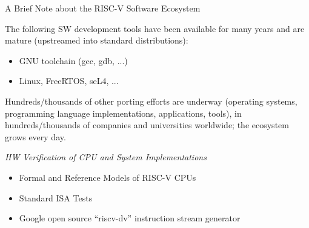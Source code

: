 \documentclass{article}
\begin{document}
\clearpage


\begin{center}
  {\Huge
    A Brief Note about the RISC-V Software Ecosystem}

  \vspace*{1in}

  \begin{minipage}{9in}\LARGE
    The following SW development tools have been available for many
    years and are mature (upstreamed into standard distributions):

    \begin{itemize}
    \item GNU toolchain (gcc, gdb, ...)
    \item Linux, FreeRTOS, seL4, ...
    \end{itemize}

    \vspace{1in}

    Hundreds/thousands of other porting efforts are underway
    (operating systems, programming language implementations,
    applications, tools), in hundreds/thousands of companies and
    universities worldwide; the ecosystem grows every day.

  \end{minipage}

\end{center}

\clearpage


\begin{center}\Huge
  \vspace*{2in}

  \emph{HW Verification of CPU and System Implementations}

  \vspace*{1in}
  
  \begin{minipage}{7in}\LARGE
    \begin{itemize}
    \item Formal and Reference Models of RISC-V CPUs
    \item Standard ISA Tests
    \item Google open source ``riscv-dv'' instruction stream generator
    \end{itemize}
  \end{minipage}

\end{center}
\end{document}
